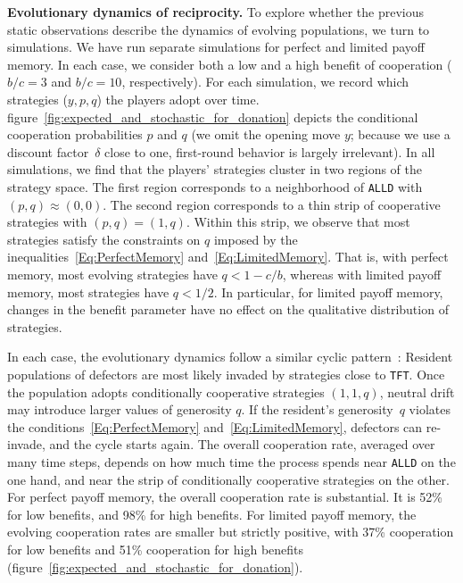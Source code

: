 \documentclass[11pt]{article}
\def\alld{\texttt{ALLD}}
\def\tft{\texttt{TFT}}
\newcommand{\FigBaseResults}{figure~\ref{fig:expected_and_stochastic_for_donation}}
\theoremstyle{plainCl1}
\theoremstyle{plainCl2}
\begin{document}
\noindent
{\bf Evolutionary dynamics of reciprocity.}
To explore whether the previous static observations describe the dynamics of evolving populations, we turn to simulations.
We have run separate simulations for perfect and limited payoff memory. 
In each case, we consider both a low and a high benefit of cooperation ($b/c\!=\!3$ and $b/c\!=\!10$, respectively).  
For each simulation, we record which strategies ($y,p,q$) the players adopt over time.
\FigBaseResults{} depicts the conditional cooperation probabilities $p$ and $q$ (we omit the opening move \(y\); because we use a discount factor~\(\delta\) close to one, first-round behavior is largely irrelevant). 
In all simulations, we find that the players' strategies cluster in two regions of the strategy space. 
The first region corresponds to a neighborhood of \alld{} with $(p,q)\!\approx\!(0,0)$.
The second region corresponds to a thin strip of cooperative strategies with $(p,q)\!=\!(1,q)$. 
Within this strip, we observe that most strategies satisfy the constraints on $q$ imposed by the inequalities~\eqref{Eq:PerfectMemory} and~\eqref{Eq:LimitedMemory}. 
That is, with perfect memory, most evolving strategies have $q\!<\!1\!-\!c/b$, whereas with limited payoff memory, most strategies have $q\!<\!1/2$. 
In particular, for limited payoff memory, changes in the benefit parameter have no effect on the qualitative distribution of strategies. 


In each case, the evolutionary dynamics follow a similar cyclic pattern~\citep[as previously described in Refs.][]{imhof2010stochastic, Nowak1992tit}:
Resident populations of defectors are most likely invaded by strategies close to \tft. 
Once the population adopts conditionally cooperative strategies  $(1,1,q)$, neutral drift may introduce larger values of generosity $q$. 
If the resident's generosity~$q$ violates the conditions~\eqref{Eq:PerfectMemory} and~\eqref{Eq:LimitedMemory}, defectors can re-invade, and the cycle starts again. 
The overall cooperation rate, averaged over many time steps, depends on how much time the process spends near \alld{} on the one hand, and near the strip of conditionally cooperative strategies on the other. 
For perfect payoff memory, the overall cooperation rate is substantial. 
It is 52\% for low benefits, and 98\% for high benefits. 
For limited payoff memory, the evolving cooperation rates are smaller but strictly positive, with 37\% cooperation for low benefits and 51\% cooperation for high benefits (\FigBaseResults). 
\end{document}
